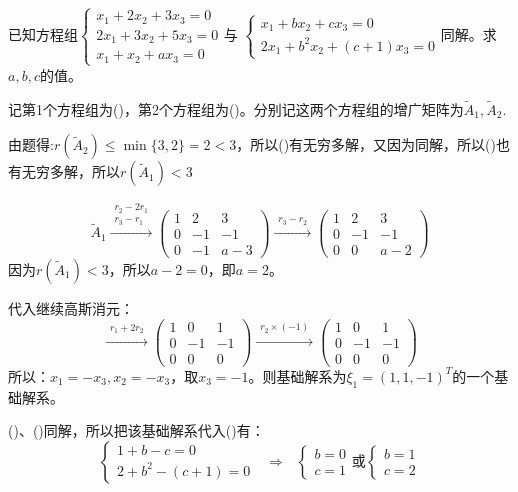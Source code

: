 \documentclass[a4paper]{report}
\begin{document}
\EX 已知方程组$
\begin{cases}
x_1+2x_2+3x_3=0\\
2x_1+3x_2+5x_3=0\\
x_1+x_2+ax_3=0
\end{cases}
$与
$
\begin{cases}
x_1+bx_2+cx_3=0\\
2x_1+b^2x_2+(c+1)x_3=0
\end{cases}
$同解。求$a,b,c$的值。

\begin{jie}
记第1个方程组为(\uppercase\expandafter{})，第2个方程组为(\uppercase\expandafter{})。分别记这两个方程组的增广矩阵为$\widetilde{A}_1,\widetilde{A}_2$.

由题得:$r(\widetilde{A}_2)\leq\min\{3,2\}=2<3$，所以(\uppercase\expandafter{})有无穷多解，又因为同解，所以(\uppercase\expandafter{})也有无穷多解，所以$r(\widetilde{A}_1)<3$

\begin{equation*}
\widetilde{A}_1\xrightarrow{\substack{r_2-2r_1\\ r_3-r_1}}
{\begin{pmatrix}
1&2&3\\
0&-1&-1\\
0&-1&a-3\end{pmatrix}
}\xrightarrow{\substack{r_3-r_2}}
{\begin{pmatrix}
1&2&3\\
0&-1&-1\\
0&0&a-2\end{pmatrix}
}
\end{equation*}
因为$r(\widetilde{A}_1)<3$，所以$a-2=0$，即$a=2$。

代入继续高斯消元：
\begin{equation*}
\xrightarrow{\substack{r_1+2r_2}}
{
\begin{pmatrix}
1&0&1\\
0&-1&-1\\
0&0&0
\end{pmatrix}
}\xrightarrow{\substack{r_2\times(-1)}}
{
\begin{pmatrix}
1&0&1\\
0&-1&-1\\
0&0&0
\end{pmatrix}
}
\end{equation*}
所以：$x_1=-x_3,x_2=-x_3$，取$x_3=-1$。则基础解系为$\xi_1=(1,1,-1)^T$的一个基础解系。

(\uppercase\expandafter{})、(\uppercase\expandafter{})同解，所以把该基础解系代入(\uppercase\expandafter{})有：
\begin{equation*}
\begin{cases}
1+b-c=0\\
2+b^2-(c+1)=0
\end{cases}~~~\Rightarrow~~~
\begin{cases}
b=0\\
c=1
\end{cases}\text{或}
\begin{cases}
b=1\\
c=2
\end{cases}
\end{equation*}


\end{jie}
\end{document}
